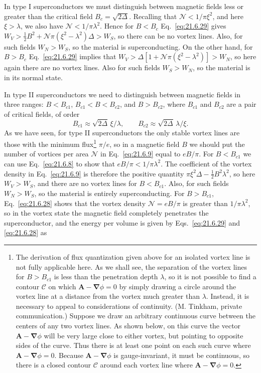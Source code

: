 In type I superconductors we must distinguish between magnetic fields less or greater than the critical field $B_c=\sqrt{2\Delta}$. Recalling that $\mathcal N<1/\pi\xi^2$, and here $\xi>\lambda$, we also have $\mathcal N<1/\pi\lambda^2$. Hence for $B<B_c$ Eq.~\eqref{eq:21.6.29} gives $W_V>\frac12B^2+\mathcal N\pi(\xi^2-\lambda^2)\Delta>W_S$, so there can be no vortex lines. Also, for such fields $W_N>W_S$, so the material is superconducting. On the other hand, for $B>B_c$ Eq.~\eqref{eq:21.6.29} implies that $W_V>\Delta[1+\mathcal N\pi(\xi^2-\lambda^2)]>W_N$, so here again there are no vortex lines. Also for such fields $W_S>W_N$, so the material is in its normal state.

In type II superconductors we need to distinguish between magnetic fields in three ranges: $B<B_{c1}$, $B_{c1}<B<B_{c2}$, and $B>B_{c2}$, where $B_{c1}$ and $B_{c2}$ are a pair of critical fields, of order
\[
B_{c1}\approx\sqrt{2\Delta}\,\xi/\lambda,
\qquad
B_{c2}\approx\sqrt{2\Delta}\,\lambda/\xi.
\]
As we have seen, for type II superconductors the only stable vortex lines are those with the minimum flux\footnote{The derivation of flux quantization given above for an isolated vortex line is not fully applicable here. As we shall see, the separation of the vortex lines for $B>B_{c1}$ is less than the penetration depth $\lambda$, so it is not possible to find a contour $\mathcal C$ on which $\mathbf A-\boldsymbol\nabla\phi=0$ by simply drawing a circle around the vortex line at a distance from the vortex much greater than $\lambda$. Instead, it is necessary to appeal to considerations of continuity. (M. Tinkham, private communication.) Suppose we draw an arbitrary continuous curve between the centers of any two vortex lines. As shown below, on this curve the vector $\mathbf A-\boldsymbol\nabla\phi$ will be very large close to either vortex, but pointing to opposite sides of the curve. Thus there is at least one point on each such curve where $\mathbf A-\boldsymbol\nabla\phi=0$. Because $\mathbf A-\boldsymbol\nabla\phi$ is gauge-invariant, it must be continuous, so there is a closed contour $\mathcal C$ around each vortex line where $\mathbf A-\boldsymbol\nabla\phi=0$.} $\pi/e$, so in a magnetic field $B$ we should put the number of vortices per area $\mathcal N$ in Eq.~\eqref{eq:21.6.9} equal to $eB/\pi$. For $B<B_{c1}$ we can use Eq.~\eqref{eq:21.6.8} to show that $eB/\pi<1/\pi\lambda^2$. The coefficient of the vortex density in Eq.~\eqref{eq:21.6.9} is therefore the positive quantity $\pi\xi^2\Delta-\frac12B^2\lambda^2$, so here $W_V>W_S$, and there are no vortex lines for $B<B_{c1}$. Also, for such fields $W_N>W_S$, so the material is entirely superconducting. For $B>B_{c1}$, Eq.~\eqref{eq:21.6.28} shows that the vortex density $\mathcal N=eB/\pi$ is greater than $1/\pi\lambda^2$, so in the vortex state the magnetic field completely penetrates the superconductor, and the energy per volume is given by Eqs.~\eqref{eq:21.6.29} and \eqref{eq:21.6.28} as
